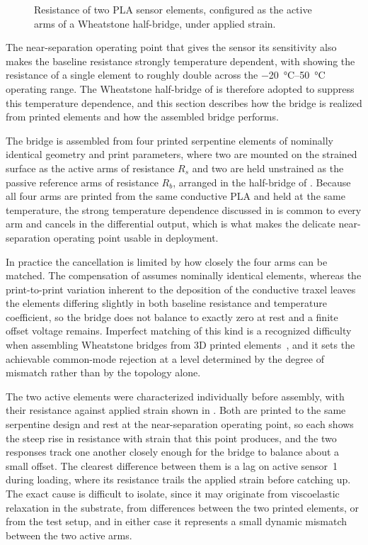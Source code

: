 \begin{figure}[!b]
\centering

    \caption{Resistance of two PLA sensor elements, configured as the active arms of a Wheatstone half-bridge, under applied strain.}
    \label{fig:Wheatstone_sensorer}
\end{figure}

The near-separation operating point that gives the sensor its sensitivity also makes the baseline resistance strongly temperature dependent, with  showing the resistance of a single element to roughly double across the \SIrange{-20}{50}{\celsius} operating range. The Wheatstone half-bridge of  is therefore adopted to suppress this temperature dependence, and this section describes how the bridge is realized from printed elements and how the assembled bridge performs.

The bridge is assembled from four printed serpentine elements of nominally identical geometry and print parameters, where two are mounted on the strained surface as the active arms of resistance $R_s$ and two are held unstrained as the passive reference arms of resistance $R_b$, arranged in the half-bridge of . Because all four arms are printed from the same conductive PLA and held at the same temperature, the strong temperature dependence discussed in  is common to every arm and cancels in the differential output, which is what makes the delicate near-separation operating point usable in deployment.

In practice the cancellation is limited by how closely the four arms can be matched. The compensation of  assumes nominally identical elements, whereas the print-to-print variation inherent to the deposition of the conductive traxel leaves the elements differing slightly in both baseline resistance and temperature coefficient, so the bridge does not balance to exactly zero at rest and a finite offset voltage remains. Imperfect matching of this kind is a recognized difficulty when assembling Wheatstone bridges from 3D printed elements~\cite{3DprintWheatstoneStrain}, and it sets the achievable common-mode rejection at a level determined by the degree of mismatch rather than by the topology alone.

The two active elements were characterized individually before assembly, with their resistance against applied strain shown in . Both are printed to the same serpentine design and rest at the near-separation operating point, so each shows the steep rise in resistance with strain that this point produces, and the two responses track one another closely enough for the bridge to balance about a small offset. The clearest difference between them is a lag on active sensor~1 during loading, where its resistance trails the applied strain before catching up. The exact cause is difficult to isolate, since it may originate from viscoelastic relaxation in the substrate, from differences between the two printed elements, or from the test setup, and in either case it represents a small dynamic mismatch between the two active arms.

